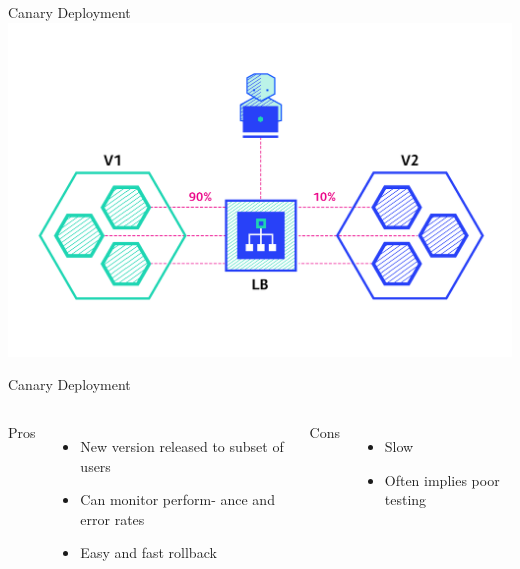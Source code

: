\documentclass{slide}
\begin{document}
\begin{frame}{Canary Deployment \cite{deployment-strategies}}
    \vspace{1pt}
    \centering
    \includegraphics[height=\textheight]{diagrams/canary/fnum14.png}
\end{frame}

\begin{frame}{Canary Deployment}
    \vspace{1pt}
    \begin{columns}[t]
      \huge Pros
      {\LARGE
        \begin{itemize}
            \item New version released to subset of users
            \item Can monitor perform- ance and error rates
            \item Easy and fast rollback
        \end{itemize}
      }
      \huge Cons
      {\LARGE
        \begin{itemize}
            \item Slow
            \item Often implies poor testing
        \end{itemize}
      }
    \end{columns}
\end{frame}
\end{document}
